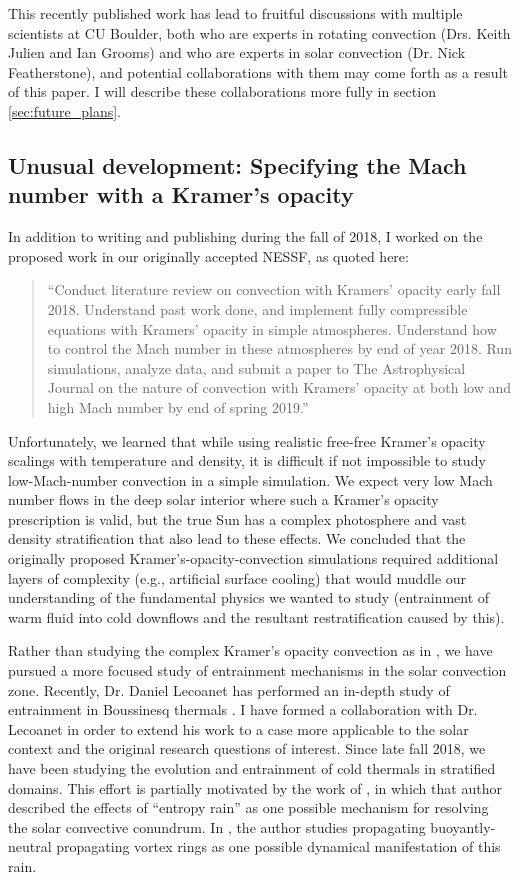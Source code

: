 \documentclass[aasms,12pt]{article}
\begin{document}
This recently published work has lead to fruitful discussions with multiple scientists at
CU Boulder, both who are experts in rotating convection (Drs. Keith Julien and Ian Grooms)
and who are experts in solar convection (Dr. Nick Featherstone), and potential collaborations
with them may come forth as a result of this paper. I will describe these collaborations
more fully in section \ref{sec:future_plans}.

\subsection{Unusual development: Specifying the Mach number with a Kramer's opacity}
In addition to writing and publishing \citet{anders&all2019} during the fall of 2018, I 
worked on the proposed work in our originally accepted NESSF, as quoted here:

\begin{quote}
``Conduct literature review on convection with Kramers' opacity early fall 2018.  
Understand past work done, and implement fully compressible equations with Kramers'
opacity in simple atmospheres.  Understand how to control the Mach number in these
atmospheres by end of year 2018.  Run simulations, analyze data, and submit a paper to The Astrophysical Journal
on the nature of convection with Kramers' opacity at both low and high Mach number by
end of spring 2019.''
\end{quote}

Unfortunately, we learned that while using realistic free-free Kramer's opacity scalings with
temperature and density, it is difficult if not impossible to study low-Mach-number convection
in a simple simulation. We expect very low Mach number flows in the deep solar interior where
such a Kramer's opacity prescription is valid, but the true Sun has a complex photosphere and
vast density stratification that also lead to these effects. We concluded that the originally
proposed Kramer's-opacity-convection simulations required additional layers of complexity 
(e.g., artificial surface cooling) that would muddle our understanding of the fundamental
physics we wanted to study (entrainment of warm fluid into cold downflows and the resultant
restratification caused by this).

Rather than studying the complex Kramer's opacity convection as in \citet{kapyla&all2017},
we have pursued a more focused study of entrainment mechanisms in the solar convection zone.
Recently, Dr. Daniel Lecoanet has performed an in-depth study of entrainment in Boussinesq
thermals \citep[][in review]{lecoanet&jevanjee2018}. I have formed a collaboration with 
Dr. Lecoanet in order to extend his work to a case more applicable to the solar context and
the original research questions of interest. Since late fall 2018, we have been studying
the evolution and entrainment of cold thermals in stratified domains. This effort is partially
motivated by the work of \citet{brandenburg2016}, in which that author described the effects
of ``entropy rain'' as one possible mechanism for resolving the solar convective conundrum.
In \citet{brandenburt2016}, the author studies propagating buoyantly-neutral propagating
vortex rings as one possible dynamical manifestation of this rain.
\end{document}
